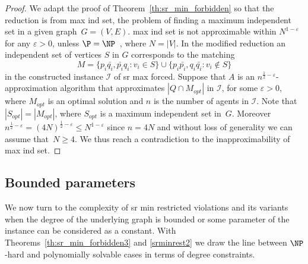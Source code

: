 \documentclass[preprint,12pt]{elsarticle}
\begin{document}
\begin{proof}
We adapt the proof of Theorem~\ref{th:sr_min_forbidden} so that the reduction is from {\sc max ind set}, the problem of finding a maximum independent set in a given graph~$G=(V,E)$.  {\sc max ind set} is not approximable within $N^{1-\varepsilon}$ for any $\varepsilon > 0$, unless $\P = \NP$~\cite{Zuc07}, where $N=|V|$. In the modified reduction an independent set of vertices $S$ in $G$ corresponds to the matching 
\[M=\{p_i\bar{q_i},\bar{p_i}q_i : v_i\in S\}\cup
    \{p_i\bar{p_i},q_i\bar{q_i} : v_i\notin S\}\]
in the constructed instance $\mathcal{I}$ of {\sc sr max forced}.
Suppose that $A$ is an $n^{\frac{1}{2}-\varepsilon}$-approximation algorithm that approximates $|Q \cap M_{opt}|$ in $\mathcal{I}$, for some $\varepsilon>0$, where $M_{opt}$ is an optimal solution and $n$ is the number of agents in $\mathcal{I}$.  Note that $|S_{opt}|=|M_{opt}|$, where $S_{opt}$ is a maximum independent set in~$G$.  Moreover  $n^{\frac{1}{2}-\varepsilon}=(4N)^{\frac{1}{2}-\varepsilon}\leq N^{1-\varepsilon}$ since $n=4N$ and without loss of generality we can assume that~$N\geq 4$.  We thus reach a contradiction to the inapproximability of {\sc max ind set}.
\end{proof}

\subsection{Bounded parameters}
\label{sec:bdd4}
We now turn to the complexity of {\sc sr min restricted violations} and its variants when the degree of the underlying graph is bounded or some parameter of the instance can be considered as a constant. With Theorems~\ref{th:sr_min_forbidden3} and \ref{srminrest2} we draw the line between $\NP$-hard and polynomially solvable cases in terms of degree constraints.
\end{document}
